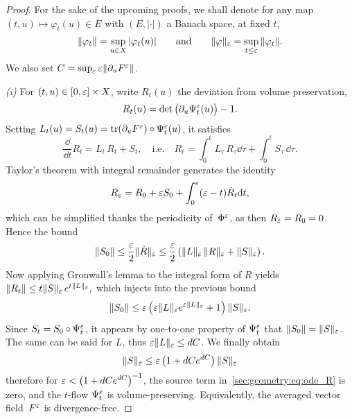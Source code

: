 \begin{proof}%
%
For the sake of the upcoming proofs, we shall denote for any map $(t,u)
\mapsto \varphi_t(u) \in E$ with $(E, | \cdot |)$ a Banach space, 
at fixed $t$, 
\begin{equation*}
  \| \varphi_t \| = \sup_{u \in X} | \varphi_t(u) | 
  \qquad\text{and}\qquad
  \| \varphi \|_{\varepsilon} = \sup_{t \leq \varepsilon } \| \varphi_t \| .
\end{equation*}
We also set $C = \sup_{\varepsilon} \varepsilon \| \partial_u F^{\varepsilon} \|$. 
%

\medskip\noindent%
\textit{(i)}\indent%
For $(t,u) \in [0,\varepsilon] \times X$, write $R_t(u)$ the deviation from
volume preservation,
\begin{equation*}
  R_t(u) = \det \big( \partial_u \Psi^{\varepsilon}_t(u) \big) - 1 .
\end{equation*}
Setting $L_t(u) = S_t(u) = \operatorname{tr} ( \partial_u F^{\varepsilon} ) \circ \Psi^{\varepsilon}_t(u)$, it
satisfies
\begin{equation} \label{sec:geometry:eq:ode_R}
  \frac{\dd}{\dd t} R_t = L_t\, R_t + S_t,
  \quad\text{i.e.}\quad
  R_t = \int_0^t L_\tau\, R_\tau \dd \tau 
    + \int_0^t S_\tau \, \dd \tau .
\end{equation}
Taylor's theorem with integral remainder generates the identity 
\begin{equation*}
  R_{\varepsilon} = R_0 + \varepsilon S_0 + \int_0^{\varepsilon} (\varepsilon - t) \dot{R}_t \mathrm{d} t ,
\end{equation*}
which can be simplified thanks the periodicity of~$\Phi^{\varepsilon}$, as then
$R_{\varepsilon} = R_0 = 0$. Hence the bound 
\begin{equation*}
  \| S_0 \| \leq \frac{\varepsilon}{2} \| \dot{R} \|_{\varepsilon}
  \leq \frac{\varepsilon}{2} \left( \| L \|_{\varepsilon} \, \| R \|_{\varepsilon} 
    + \| S \|_{\varepsilon} \right) . 
\end{equation*}
Now applying Gronwall's lemma to the integral form of $R$ yields
$
  \| R_t \| \leq t \|S\|_{\varepsilon} \, e^{t \|L\|_{\varepsilon}} , 
$
which injects into the previous bound 
\begin{equation*}
  \| S_0 \| 
    \leq \varepsilon\left( \varepsilon \|L\|_{\varepsilon} e^{\varepsilon \|L\|_{\varepsilon}} + 1\right) 
      \| S \|_{\varepsilon} .
\end{equation*}
Since $S_t = S_0 \circ \Psi_t^{\varepsilon}$, it appears by one-to-one property of
$\Psi^{\varepsilon}_t$ that $\|S_0\| = \| S \|_{\varepsilon}$. The same can be said for $L$,
thus $\varepsilon \| L \|_{\varepsilon} \leq d C$. We finally obtain 
\begin{equation*}
  \| S \|_{\varepsilon} \leq \varepsilon \left(1 + d C e^{d C}\right) \| S \|_{\varepsilon}
\end{equation*}
therefore for $\varepsilon < \left(1 + d C e^{d C}\right)^{-1}$, the source term
in~\eqref{sec:geometry:eq:ode_R} is zero, and the $t$-flow $\Psi^{\varepsilon}_t$
is volume-preserving. Equivalently, the averaged vector field~$F^{\varepsilon}$ is
divergence-free. 


\end{proof}
